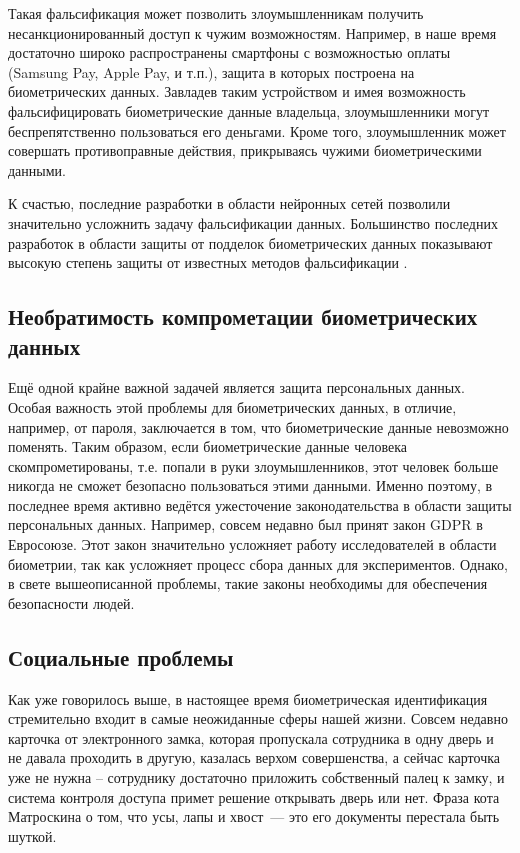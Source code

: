 \documentclass[14pt, a4paper]{extarticle}
\begin{document}
Такая фальсификация может позволить злоумышленникам получить несанкционированный доступ к чужим возможностям. Например, в наше время достаточно широко распространены смартфоны с возможностью оплаты (Samsung Pay, Apple Pay, и т.п.), защита в которых построена на биометрических данных. Завладев таким устройством и имея возможность фальсифицировать биометрические данные владельца, злоумышленники могут беспрепятственно пользоваться его деньгами. Кроме того, злоумышленник может совершать противоправные действия, прикрываясь чужими биометрическими данными.

К счастью, последние разработки в области нейронных сетей позволили значительно усложнить задачу фальсификации данных. Большинство последних разработок в области защиты от подделок биометрических данных показывают высокую степень защиты от известных методов фальсификации \cite{odinokikh2018iris, sajjad2018cnn}.

\subsection{Необратимость компрометации биометрических данных}
Ещё одной крайне важной задачей является защита персональных данных. Особая важность этой проблемы для биометрических данных, в отличие, например, от пароля, заключается в том, что биометрические данные невозможно поменять. Таким образом, если биометрические данные человека скомпрометированы, т.е. попали в руки злоумышленников, этот человек больше никогда не сможет безопасно пользоваться этими данными. Именно поэтому, в последнее время активно ведётся ужесточение законодательства в области защиты персональных данных. Например, совсем недавно был принят закон GDPR в Евросоюзе. Этот закон значительно усложняет работу исследователей в области биометрии, так как усложняет процесс сбора данных для экспериментов. Однако, в свете вышеописанной проблемы, такие законы необходимы для обеспечения безопасности людей.

\subsection{Социальные проблемы}
Как уже говорилось выше, в настоящее время биометрическая идентификация стремительно входит в самые неожиданные сферы нашей жизни. Совсем недавно карточка от электронного замка, которая пропускала сотрудника в одну дверь и не давала проходить в другую, казалась верхом совершенства, а сейчас карточка уже не нужна – сотруднику достаточно приложить собственный палец к замку, и система контроля доступа примет решение открывать дверь или нет. Фраза кота Матроскина о том, что усы, лапы и хвост~--- это его документы \cite{matroskin} перестала быть шуткой.
\end{document}
